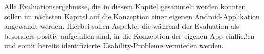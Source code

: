 Alle Evaluationsergebnisse, die in diesem Kapitel gesammelt werden konnten, sollen im nächsten Kapitel auf die Konzeption einer eigenen Android-Applikation angewandt werden.
Hierbei sollen Aspekte, die während der Evaluation als besonders positiv aufgefallen sind, in die Konzeption der eigenen App einfließen und somit bereits identifizierte Usability-Probleme vermieden werden.
